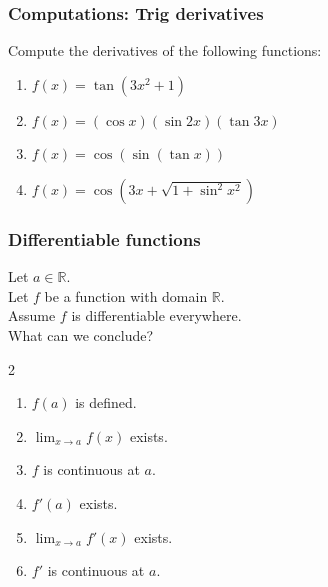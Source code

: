 \documentclass[14pt]{beamer}
\begin{document}

	\begin{frame}[t]
		\frametitle{Computations: Trig derivatives}

		Compute the derivatives of the following functions:

		\begin{enumerate}

			\item $\displaystyle f(x) = \tan (3x^{2}+1)$

				\vfill

			\item $\displaystyle f(x) = (\cos x )( \sin 2x )(\tan 3x)$

				\vfill

			\item $\displaystyle f(x) = \cos ( \sin( \tan x))$
				\vfill

			\item $\displaystyle f(x) = \cos \left( 3x + \sqrt{1 + \sin^{2}x^{2}}\right
				)$
				\vfill
		\end{enumerate}
	\end{frame}





	\begin{frame}[t]
		\frametitle{Differentiable functions}

		Let $a \in \mathbb{R}$. \\ Let $f$ be a function with domain $\mathbb{R}$.
		\\ Assume $f$ is differentiable everywhere. \\ What can we conclude?

		\begin{multicols}{2}
			\begin{enumerate}
				\item $f(a)$ is defined.

				\item $\displaystyle \lim_{x \to a}f(x)$ exists.

				\item $f$ is continuous at $a$.

				\item $f'(a)$ exists.

				\item $\displaystyle \lim_{x \to a}f'(x)$ exists.

				\item $\displaystyle f'$ is continuous at $a$.
			\end{enumerate}
		\end{multicols}
	\end{frame}
\end{document}
